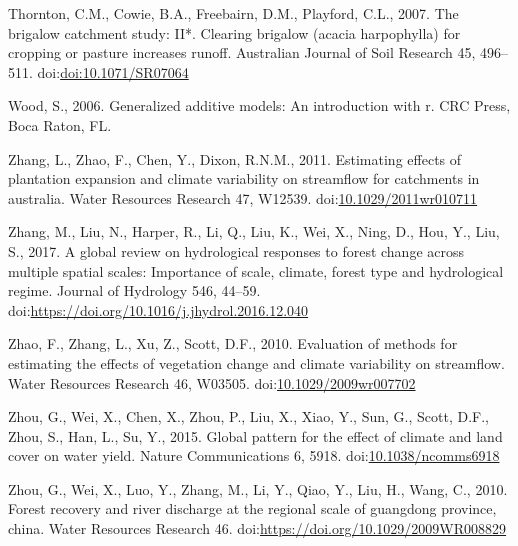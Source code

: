 \documentclass[]{elsarticle} %
\begin{document}
\leavevmode\hypertarget{ref-thornton2007}{}%
Thornton, C.M., Cowie, B.A., Freebairn, D.M., Playford, C.L., 2007. The
brigalow catchment study: II*. Clearing brigalow (acacia harpophylla)
for cropping or pasture increases runoff. Australian Journal of Soil
Research 45, 496--511.
doi:\href{https://doi.org/doi:10.1071/SR07064}{doi:10.1071/SR07064}

\leavevmode\hypertarget{ref-wood2006}{}%
Wood, S., 2006. Generalized additive models: An introduction with r. CRC
Press, Boca Raton, FL.

\leavevmode\hypertarget{ref-zhang2011}{}%
Zhang, L., Zhao, F., Chen, Y., Dixon, R.N.M., 2011. Estimating effects
of plantation expansion and climate variability on streamflow for
catchments in australia. Water Resources Research 47, W12539.
doi:\href{https://doi.org/10.1029/2011wr010711}{10.1029/2011wr010711}

\leavevmode\hypertarget{ref-zhang2017}{}%
Zhang, M., Liu, N., Harper, R., Li, Q., Liu, K., Wei, X., Ning, D., Hou,
Y., Liu, S., 2017. A global review on hydrological responses to forest
change across multiple spatial scales: Importance of scale, climate,
forest type and hydrological regime. Journal of Hydrology 546, 44--59.
doi:\href{https://doi.org/https://doi.org/10.1016/j.jhydrol.2016.12.040}{https://doi.org/10.1016/j.jhydrol.2016.12.040}

\leavevmode\hypertarget{ref-zhao2010}{}%
Zhao, F., Zhang, L., Xu, Z., Scott, D.F., 2010. Evaluation of methods
for estimating the effects of vegetation change and climate variability
on streamflow. Water Resources Research 46, W03505.
doi:\href{https://doi.org/10.1029/2009wr007702}{10.1029/2009wr007702}

\leavevmode\hypertarget{ref-zhou2015}{}%
Zhou, G., Wei, X., Chen, X., Zhou, P., Liu, X., Xiao, Y., Sun, G.,
Scott, D.F., Zhou, S., Han, L., Su, Y., 2015. Global pattern for the
effect of climate and land cover on water yield. Nature Communications
6, 5918.
doi:\href{https://doi.org/10.1038/ncomms6918}{10.1038/ncomms6918}

\leavevmode\hypertarget{ref-zhou2010}{}%
Zhou, G., Wei, X., Luo, Y., Zhang, M., Li, Y., Qiao, Y., Liu, H., Wang,
C., 2010. Forest recovery and river discharge at the regional scale of
guangdong province, china. Water Resources Research 46.
doi:\href{https://doi.org/https://doi.org/10.1029/2009WR008829}{https://doi.org/10.1029/2009WR008829}
\end{document}
